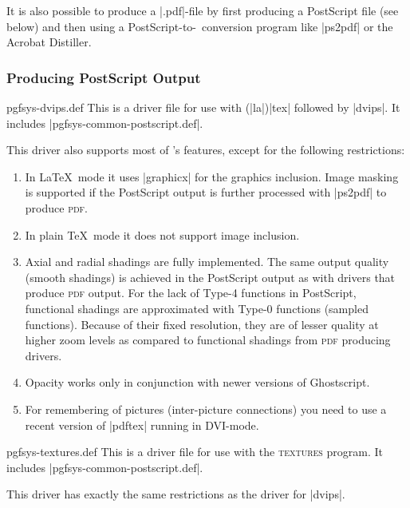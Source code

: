 It is also possible to produce a |.pdf|-file by first producing a PostScript
file (see below) and then using a PostScript-to-\pdf\ conversion program like
|ps2pdf| or the Acrobat Distiller.


\subsubsection{Producing PostScript Output}

\begin{filedescription}{pgfsys-dvips.def}
    This is a driver file for use with (|la|)|tex| followed by |dvips|. It
    includes |pgfsys-common-postscript.def|.

    This driver also supports most of \pgfname's features, except for the
    following restrictions:
    \begin{enumerate}
        \item In \LaTeX\ mode it uses |graphicx| for the graphics inclusion.
            Image masking is supported if the PostScript output is further
            processed with |ps2pdf| to produce \textsc{pdf}.
        \item In plain \TeX\ mode it does not support image inclusion.
        \item Axial and radial shadings are fully implemented. The same output
            quality (smooth shadings) is achieved in the PostScript output
            as with drivers that produce \textsc{pdf} output. For the lack
            of Type-4 functions in PostScript, functional shadings are
            approximated with Type-0 functions (sampled functions). Because
            of their fixed resolution, they are of lesser quality
            at higher zoom levels as compared to functional shadings from
            \textsc{pdf} producing drivers.
        \item Opacity works only in conjunction with newer versions of
            Ghostscript.
        \item For remembering of pictures (inter-picture connections) you
            need to use a recent version of |pdftex| running in DVI-mode.
    \end{enumerate}
\end{filedescription}

\begin{filedescription}{pgfsys-textures.def}
    This is a driver file for use with the \textsc{textures} program. It
    includes |pgfsys-common-postscript.def|.

    This driver has exactly the same restrictions as the driver for |dvips|.
\end{filedescription}

